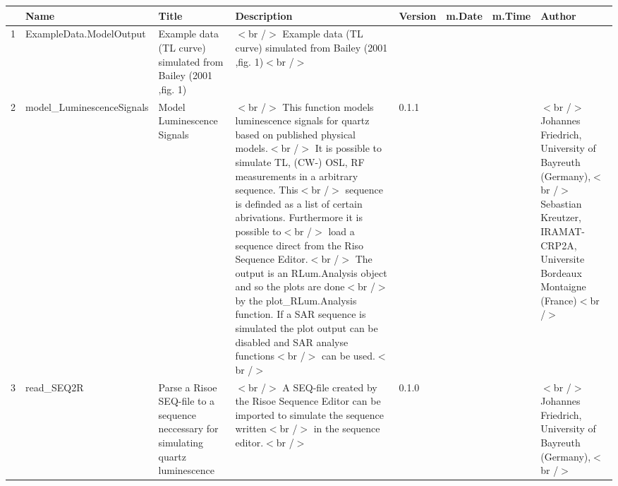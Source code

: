 \begin{table}[ht]
\centering
\begin{tabular}{rlllllll}
  \hline
 & Name & Title & Description & Version & m.Date & m.Time & Author \\ 
  \hline
1 & ExampleData.ModelOutput & Example data (TL curve) simulated from Bailey (2001 ,fig. 1) & $<$br /$>$ Example data (TL curve) simulated from Bailey (2001 ,fig. 1)$<$br /$>$ &  &  &  &  \\ 
  2 & model\_LuminescenceSignals & Model Luminescence Signals & $<$br /$>$ This function models luminescence signals for quartz based on published physical models.$<$br /$>$ It is possible to simulate TL, (CW-) OSL, RF measurements in a arbitrary sequence. This$<$br /$>$ sequence is definded as a  list  of certain abrivations. Furthermore it is possible to$<$br /$>$ load a sequence direct from the Riso Sequence Editor.$<$br /$>$ The output is an  RLum.Analysis object and so the plots are done$<$br /$>$ by the  plot\_RLum.Analysis  function. If a SAR sequence is simulated the plot output can be disabled and SAR analyse functions$<$br /$>$ can be used.$<$br /$>$ & 0.1.1
 &  &  & $<$br /$>$ Johannes Friedrich, University of Bayreuth (Germany),$<$br /$>$ Sebastian Kreutzer, IRAMAT-CRP2A, Universite Bordeaux Montaigne (France)$<$br /$>$ \\ 
  3 & read\_SEQ2R & Parse a Risoe SEQ-file to a sequence neccessary for simulating quartz luminescence & $<$br /$>$ A SEQ-file created by the Risoe Sequence Editor can be imported to simulate the sequence written$<$br /$>$ in the sequence editor.$<$br /$>$ & 0.1.0
 &  &  & $<$br /$>$ Johannes Friedrich, University of Bayreuth (Germany),$<$br /$>$ \\ 
   \hline
\end{tabular}
\end{table}

